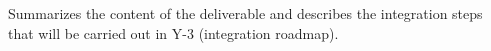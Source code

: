 Summarizes the content of the deliverable and describes the integration steps that will be carried out in Y-3 (integration roadmap).





